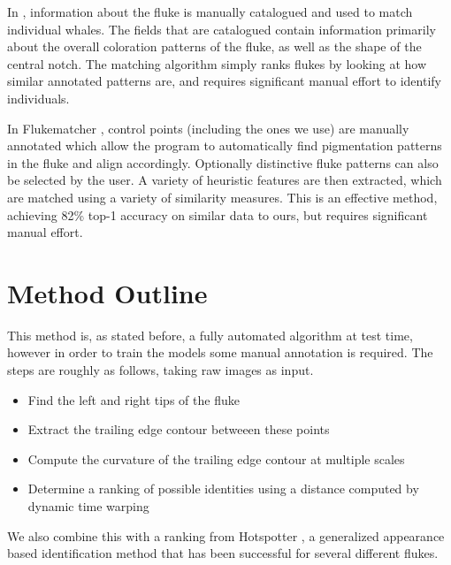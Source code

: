 In \cite{mizroch1990computer}, information about the fluke is manually catalogued and used to match individual whales. 
The fields that are catalogued contain information primarily about the overall coloration patterns of the fluke, as well as the shape of the central notch. 
The matching algorithm simply ranks flukes by looking at how similar annotated patterns are, and requires significant manual effort to identify individuals.

In Flukematcher \cite{kniest2010fluke}, control points (including the ones we use) are manually annotated which allow the program to automatically find pigmentation patterns in the fluke and align accordingly.
Optionally distinctive fluke patterns can also be selected by the user.
A variety of heuristic features are then extracted, which are matched using a variety of similarity measures.
This is an effective method, achieving 82\% top-1 accuracy on similar data to ours, but requires significant manual effort.

\section{Method Outline}

This method is, as stated before, a fully automated algorithm at test time, however in order to train the models some manual annotation is required.
The steps are roughly as follows, taking raw images as input.

\begin{itemize}
	\item Find the left and right tips of the fluke
	\item Extract the trailing edge contour betweeen these points
	\item Compute the curvature of the trailing edge contour at multiple scales
	\item Determine a ranking of possible identities using a distance computed by dynamic time warping 
\end{itemize}

We also combine this with a ranking from Hotspotter \cite{crall_hotspotter_2013}, a generalized appearance based identification method that has been successful for several different flukes. 


